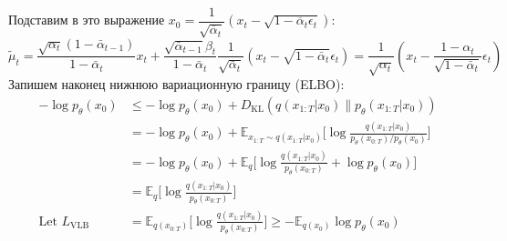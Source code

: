 Подставим в это выражение $x_0 = \dfrac{1}{\sqrt{\overline{\alpha}_t}} (x_t - \sqrt{1 - \overline{\alpha}_t\epsilon_t})$:
\[
    \tilde{{\mu}}_t = \frac{\sqrt{\alpha_t}(1 - \bar{\alpha}_{t-1})}{1 - \bar{\alpha}_t} x_t + \frac{\sqrt{\bar{\alpha}_{t-1}}\beta_t}{1 - \bar{\alpha}_t} \frac{1}{\sqrt{\bar{\alpha}_t}}(x_t - \sqrt{1 - \bar{\alpha}_t}{\epsilon}_t) = \frac{1}{\sqrt{\alpha_t}} \left( x_t - \frac{1 - \alpha_t}{\sqrt{1 - \bar{\alpha}_t}} {\epsilon}_t \right)
\]
Запишем наконец нижнюю вариационную границу (ELBO):
\[
\begin{aligned}
- \log p_\theta(x_0) 
&\leq - \log p_\theta(x_0) + D_\text{KL}(q(x_{1:T}|x_0) \| p_\theta(x_{1:T}|x_0) ) \\
&= -\log p_\theta(x_0) + \mathbb{E}_{x_{1:T}\sim q(x_{1:T} | x_0)} \Big[ \log\frac{q(x_{1:T}|x_0)}{p_\theta(x_{0:T}) / p_\theta(x_0)} \Big] \\
&= -\log p_\theta(x_0) + \mathbb{E}_q \Big[ \log\frac{q(x_{1:T}|x_0)}{p_\theta(x_{0:T})} + \log p_\theta(x_0) \Big] \\
&= \mathbb{E}_q \Big[ \log \frac{q(x_{1:T}|x_0)}{p_\theta(x_{0:T})} \Big] \\
\text{Let }L_\text{VLB} 
&= \mathbb{E}_{q(x_{0:T})} \Big[ \log \frac{q(x_{1:T}|x_0)}{p_\theta(x_{0:T})} \Big] \geq - \mathbb{E}_{q(x_0)} \log p_\theta(x_0)
\end{aligned}
\]

